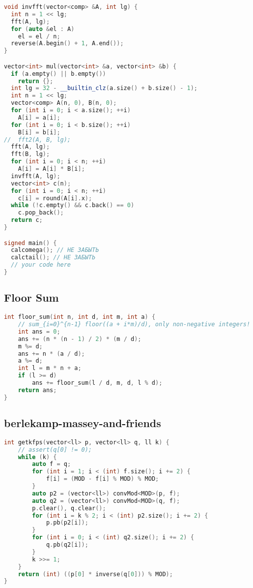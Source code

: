 \documentclass[9pt,a4paper,landscape,twosided]{extarticle}
\begin{document}
\begin{multicols*}{3}
\begin{lstlisting}[language=C++]
void invfft(vector<comp> &A, int lg) {
  int n = 1 << lg;
  fft(A, lg);
  for (auto &el : A)
    el = el / n;
  reverse(A.begin() + 1, A.end());
}

vector<int> mul(vector<int> &a, vector<int> &b) {
  if (a.empty() || b.empty())
    return {};
  int lg = 32 - __builtin_clz(a.size() + b.size() - 1);
  int n = 1 << lg;
  vector<comp> A(n, 0), B(n, 0);
  for (int i = 0; i < a.size(); ++i)
    A[i] = a[i];
  for (int i = 0; i < b.size(); ++i)
    B[i] = b[i];
//  fft2(A, B, lg);
  fft(A, lg);
  fft(B, lg);
  for (int i = 0; i < n; ++i)
    A[i] = A[i] * B[i];
  invfft(A, lg);
  vector<int> c(n);
  for (int i = 0; i < n; ++i)
    c[i] = round(A[i].x);
  while (!c.empty() && c.back() == 0)
    c.pop_back();
  return c;
}

signed main() {
  calcomega(); // НЕ ЗАБЫТЬ
  calctail(); // НЕ ЗАБЫТЬ
  // your code here
}

\end{lstlisting}

\subsection{Floor Sum}
\begin{lstlisting}[language=C++]
int floor_sum(int n, int d, int m, int a) {
    // sum_{i=0}^{n-1} floor((a + i*m)/d), only non-negative integers!
    int ans = 0;
    ans += (n * (n - 1) / 2) * (m / d);
    m %= d;
    ans += n * (a / d);
    a %= d;
    int l = m * n + a;
    if (l >= d)
        ans += floor_sum(l / d, m, d, l % d);
    return ans;
}
\end{lstlisting}

\subsection{berlekamp-massey-and-friends}
\begin{lstlisting}[language=C++]
int getkfps(vector<ll> p, vector<ll> q, ll k) {
    // assert(q[0] != 0);
    while (k) {
        auto f = q;
        for (int i = 1; i < (int) f.size(); i += 2) {
            f[i] = (MOD - f[i] % MOD) % MOD;
        }
        auto p2 = (vector<ll>) convMod<MOD>(p, f);
        auto q2 = (vector<ll>) convMod<MOD>(q, f);
        p.clear(), q.clear();
        for (int i = k % 2; i < (int) p2.size(); i += 2) {
            p.pb(p2[i]);
        }
        for (int i = 0; i < (int) q2.size(); i += 2) {
            q.pb(q2[i]);
        }
        k >>= 1;
    }
    return (int) ((p[0] * inverse(q[0])) % MOD);
}


\end{lstlisting}
\end{multicols*}
\end{document}
